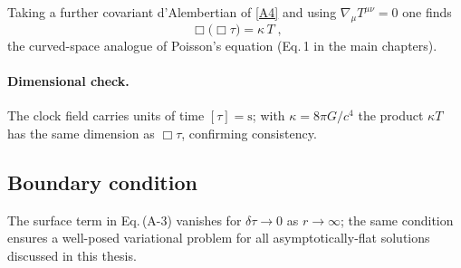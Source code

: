 Taking a further covariant d’Alembertian of \eqref{A4} and using
\(\nabla_{\!\mu}T^{\mu\nu}=0\) one finds
\[
   \boxed{\;
     \Box\bigl(\Box\tau\bigr)=\kappa\,T
   \;},
\]
the curved-space analogue of Poisson’s equation (Eq.\,1 in the main
chapters).

\paragraph{Dimensional check.}
The clock field carries units of time \([\tau]=\mathrm{s}\); with
\(\kappa=8\pi G/c^{4}\) the product \(\kappa T\) has the same dimension
as \(\Box\tau\), confirming consistency.

\subsection*{Boundary condition}

The surface term in Eq.\,(A-3) vanishes for
\(\delta\tau\to0\) as \(r\to\infty\); the same condition ensures a
well-posed variational problem for all asymptotically-flat solutions
discussed in this thesis.
